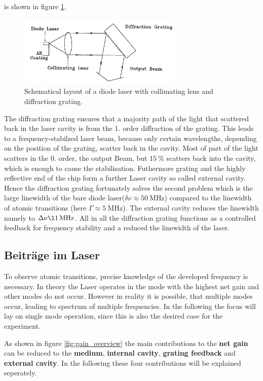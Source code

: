 is shown in figure \ref{fig:aufbau}.
\begin{figure}
  \centering
  \includegraphics[width=0.7\textwidth]{aufbau.png}
  \caption{Schematical layout of a diode laser with collimating lens and diffraction grating.\cite{V61}}
  \label{fig:aufbau}
\end{figure}

The diffraction grating ensures that a majority path of
the light that scattered back in the laser cavity is from the  1. order
diffraction of the grating. This leads to
a frequency-stabilzed laser beam, because only certain wavelengths,
depending on the position
of the grating, scatter back in the cavity.
Most of part of the light scatters in the 0. order,
the output Beam, but $\SI{15}{\percent}$ scatters back into
the cavity, which is enough to cause the stabilisation.
Futhermore grating and the highly reflective end of the chip form a
further Laser cavity
so called external cavity.
Hence the diffraction grating fortunately solves the second
problem which is the large linewidth of the bare
diode laser($\delta \nu \approx \SI{50}{\mega\hertz}$)
compared to the linewidth of atomic transitions
(here $\Gamma \approx \SI{5}{\mega\hertz}$).
The external cavity
reduces the linewidth namely to $\Delta\nu\l \SI{1}{\mega\hertz}$.
All in all the diffraction grating
functions as a controlled feedback for frequency stability
and a reduced the linewidth of the laser.

\subsection{Beiträge im Laser}
\label{subsec:}
To observe atomic transitions, precise knowledge
of the developed frequency is necessary.
In theory the Laser operates in the mode with the highest net gain
and other modes do not occur.
However in reality it is possible, that multiple modes occur, leading
to spectrum of multiple frequencies. In the following the focus will
lay on single mode operation, since this is also the desired case
for the experiment.

As shown in figure \ref{fig:gain_overview} the main contributions
to the \textbf{net gain} can be reduced to
the \textbf{medium}, \textbf{internal cavity}, \textbf{grating feedback}
and  \textbf{external cavity}.
In the following these four contributions will be explained seperately.



